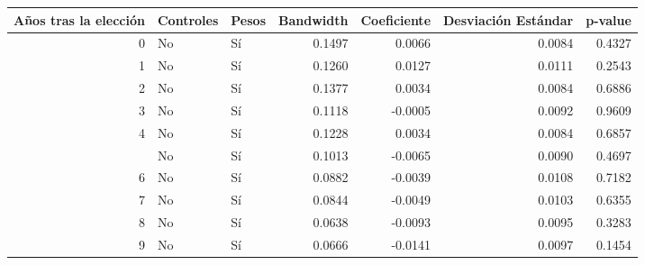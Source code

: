 
\begin{tabular}{rllrrrr}
\toprule
Años tras la elección & Controles & Pesos & Bandwidth & Coeficiente & Desviación Estándar & p-value\\
\midrule
0 & No & Sí & 0.1497 & 0.0066 & 0.0084 & 0.4327\\
1 & No & Sí & 0.1260 & 0.0127 & 0.0111 & 0.2543\\
2 & No & Sí & 0.1377 & 0.0034 & 0.0084 & 0.6886\\
3 & No & Sí & 0.1118 & -0.0005 & 0.0092 & 0.9609\\
4 & No & Sí & 0.1228 & 0.0034 & 0.0084 & 0.6857\\
\addlinespace
5 & No & Sí & 0.1013 & -0.0065 & 0.0090 & 0.4697\\
6 & No & Sí & 0.0882 & -0.0039 & 0.0108 & 0.7182\\
7 & No & Sí & 0.0844 & -0.0049 & 0.0103 & 0.6355\\
8 & No & Sí & 0.0638 & -0.0093 & 0.0095 & 0.3283\\
9 & No & Sí & 0.0666 & -0.0141 & 0.0097 & 0.1454\\
\bottomrule
\end{tabular}